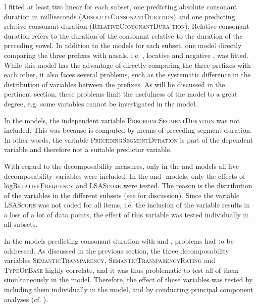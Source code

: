 I fitted at least two linear  for each subset, one predicting absolute consonant duration in milliseconds  (\textsc{AbsoluteConsonantDuration}) and one predicting relative consonant duration (\textsc{RelativeConsonantDura-\linebreak tion}). Relative consonant duration refers to the duration of the consonant relative to the duration of the preceding vowel. In addition to the models for each subset, one model directly comparing the three prefixes with nasals, i.e. , locative  and negative , was fitted. While this model has the advantage of directly comparing the three prefixes with each other, it also faces several problems, such as the systematic difference in the distribution of variables between the prefixes. As will be discussed in the pertinent section, these problems limit the usefulness of the model to a great degree, e.g. some variables cannot be investigated in the model.

In the  models, the independent variable \textsc{PrecedingSegmentDuration} was not included. This was because  is computed by means of preceding segment duration. In other words, the variable \textsc{PrecedingSegmentDuration} is part of the dependent variable and therefore not a suitable predictor variable.


With regard to the decomposability measures, only in the  and models all five decomposability variables were included. In the  and -models, only the effects of log\textsc{RelativeFrequency} and \textsc{LSAScore} were tested. The reason is the distribution of the variables in the different subsets (see  for discussion). 
Since the variable \textsc{LSAScore} was not coded for all items, i.e. the inclusion of the variable results in a loss of a lot of data points, the effect of this variable was tested individually in all subsets.\largerpage

In the models predicting consonant duration with  and ,  problems had to be addressed. As discussed in the previous section, the three decomposability variables \textsc{SemanticTransparency}, \textsc{SemanticTransparencyRating} and \textsc{TypeOfBase} highly correlate, and it was thus problematic to test all of them simultaneously in the model. Therefore, the effect of these variables was tested by including them individually in the model, and by conducting principal component analyses (cf. ). 


